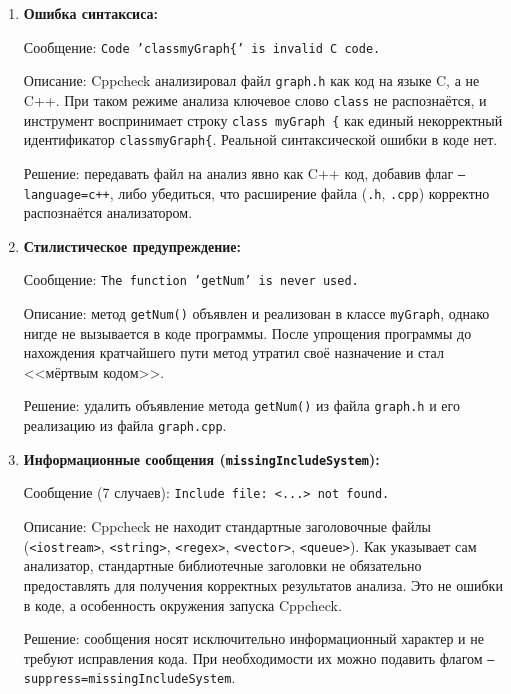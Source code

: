 \documentclass{article}[14pt]
\begin{document}
\begin{enumerate}
 
\item \textbf{Ошибка синтаксиса:}
 
Сообщение: \texttt{Code 'classmyGraph\{' is invalid C code.}
 
Описание: Cppcheck анализировал файл \texttt{graph.h} как код на языке C, а не C++.
При таком режиме анализа ключевое слово \texttt{class} не распознаётся,
и инструмент воспринимает строку \texttt{class myGraph \{} как единый некорректный
идентификатор \texttt{classmyGraph\{}. Реальной синтаксической ошибки в коде нет.
 
Решение: передавать файл на анализ явно как C++ код, добавив флаг
\texttt{--language=c++}, либо убедиться, что расширение файла
(\texttt{.h}, \texttt{.cpp}) корректно распознаётся анализатором.
 
\item \textbf{Стилистическое предупреждение:}
 
Сообщение: \texttt{The function 'getNum' is never used.}
 
Описание: метод \texttt{getNum()} объявлен и реализован в классе \texttt{myGraph},
однако нигде не вызывается в коде программы. После упрощения программы до
нахождения кратчайшего пути метод утратил своё назначение и стал <<мёртвым кодом>>.
 
Решение: удалить объявление метода \texttt{getNum()} из файла \texttt{graph.h}
и его реализацию из файла \texttt{graph.cpp}.
 
\item \textbf{Информационные сообщения (\texttt{missingIncludeSystem}):}
 
Сообщение (7 случаев): \texttt{Include file: <...> not found.}
 
Описание: Cppcheck не находит стандартные заголовочные файлы
(\texttt{<iostream>}, \texttt{<string>}, \texttt{<regex>}, \texttt{<vector>},
\texttt{<queue>}). Как указывает сам анализатор, стандартные библиотечные
заголовки не обязательно предоставлять для получения корректных результатов
анализа. Это не ошибки в коде, а особенность окружения запуска Cppcheck.
 
Решение: сообщения носят исключительно информационный характер и не требуют
исправления кода. При необходимости их можно подавить флагом
\texttt{--suppress=missingIncludeSystem}.
 
\end{enumerate}

\pagebreak
\end{document}
